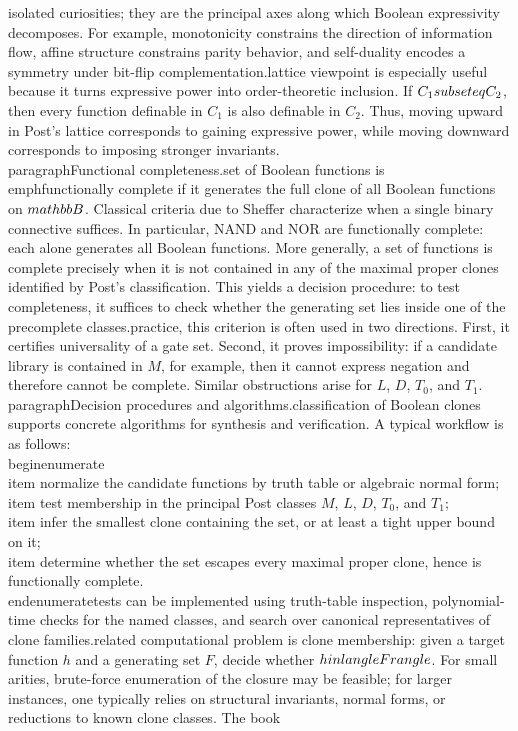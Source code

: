 isolated curiosities; they are the principal axes along which Boolean expressivity decomposes. For example, monotonicity constrains the direction of information flow, affine structure constrains parity behavior, and self-duality encodes a symmetry under bit-flip complementation.\n\nThe lattice viewpoint is especially useful because it turns expressive power into order-theoretic inclusion. If $C_1 \\subseteq C_2$, then every function definable in $C_1$ is also definable in $C_2$. Thus, moving upward in Post's lattice corresponds to gaining expressive power, while moving downward corresponds to imposing stronger invariants.\n\n\\paragraph{Functional completeness.}\nA set of Boolean functions is \\emph{functionally complete} if it generates the full clone of all Boolean functions on $\\mathbb{B}$. Classical criteria due to Sheffer characterize when a single binary connective suffices. In particular, NAND and NOR are functionally complete: each alone generates all Boolean functions. More generally, a set of functions is complete precisely when it is not contained in any of the maximal proper clones identified by Post's classification. This yields a decision procedure: to test completeness, it suffices to check whether the generating set lies inside one of the precomplete classes.\n\nIn practice, this criterion is often used in two directions. First, it certifies universality of a gate set. Second, it proves impossibility: if a candidate library is contained in $M$, for example, then it cannot express negation and therefore cannot be complete. Similar obstructions arise for $L$, $D$, $T_0$, and $T_1$.\n\n\\paragraph{Decision procedures and algorithms.}\nThe classification of Boolean clones supports concrete algorithms for synthesis and verification. A typical workflow is as follows:\n\\begin{enumerate}\n  \\item normalize the candidate functions by truth table or algebraic normal form;\n  \\item test membership in the principal Post classes $M$, $L$, $D$, $T_0$, and $T_1$;\n  \\item infer the smallest clone containing the set, or at least a tight upper bound on it;\n  \\item determine whether the set escapes every maximal proper clone, hence is functionally complete.\n\\end{enumerate}\nThese tests can be implemented using truth-table inspection, polynomial-time checks for the named classes, and search over canonical representatives of clone families.\n\nA related computational problem is clone membership: given a target function $h$ and a generating set $F$, decide whether $h \\in \\langle F\\rangle$. For small arities, brute-force enumeration of the closure may be feasible; for larger instances, one typically relies on structural invariants, normal forms, or reductions to known clone classes. The book 